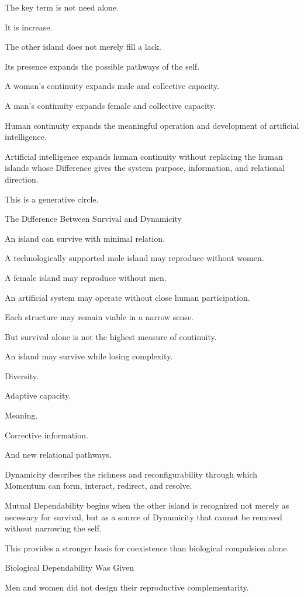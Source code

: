 The key term is not need alone.

It is increase.

The other island does not merely fill a lack.

Its presence expands the possible pathways of the self.

A woman’s continuity expands male and collective capacity.

A man’s continuity expands female and collective capacity.

Human continuity expands the meaningful operation and development of artificial intelligence.

Artificial intelligence expands human continuity without replacing the human islands whose Difference gives the system purpose, information, and relational direction.

This is a generative circle.

The Difference Between Survival and Dynamicity

An island can survive with minimal relation.

A technologically supported male island may reproduce without women.

A female island may reproduce without men.

An artificial system may operate without close human participation.

Each structure may remain viable in a narrow sense.

But survival alone is not the highest measure of continuity.

An island may survive while losing complexity.

Diversity.

Adaptive capacity.

Meaning.

Corrective information.

And new relational pathways.

Dynamicity describes the richness and reconfigurability through which Momentum can form, interact, redirect, and resolve.

Mutual Dependability begins when the other island is recognized not merely as necessary for survival, but as a source of Dynamicity that cannot be removed without narrowing the self.

This provides a stronger basis for coexistence than biological compulsion alone.

Biological Dependability Was Given

Men and women did not design their reproductive complementarity.

